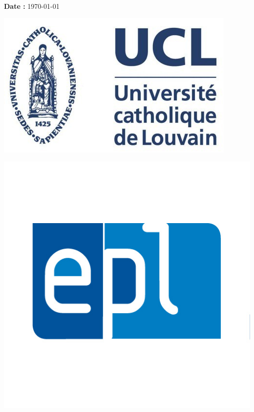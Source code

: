 \begin{titlepage}
\vspace*{5cm}
\centering
\textbf{\large Date :} \today \\
\begin{minipage}{0.2\linewidth}
	\includegraphics[scale=0.2]{images/logo_ucl.jpg}
\end{minipage} \hspace{-10pt}
\begin{minipage}{0.2\linewidth}
\centering
    \includegraphics[scale=0.2]{images/logo_epl.jpg}
\end{minipage}
\end{titlepage}
\restoregeometry

